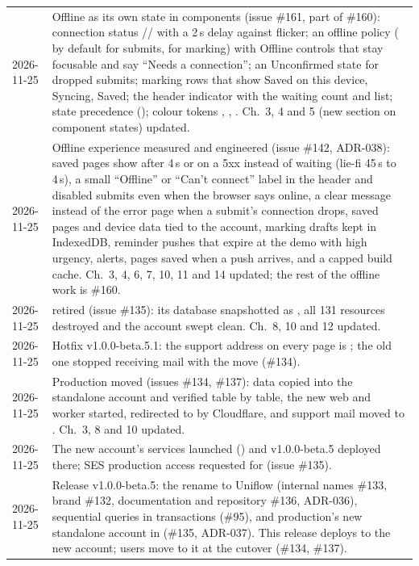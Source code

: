 \begin{xltabular}{\linewidth}{@{}l L@{}}
  2026-11-25 & Offline as its own state in components (issue \#161, part of \#160): connection status // with a 2\,s delay against flicker; an offline policy ( by default for submits,  for marking) with  Offline controls that stay focusable and say ``Needs a connection''; an Unconfirmed state for dropped submits; marking rows that show Saved on this device, Syncing, Saved; the header indicator with the waiting count and list; state precedence (); colour tokens , , . Ch.~3, 4 and 5 (new section on component states) updated.\\
  2026-11-25 & Offline experience measured and engineered (issue \#142, ADR-038): saved pages show after 4\,s or on a 5xx instead of waiting (lie-fi 45\,s to 4\,s), a small ``Offline'' or ``Can't connect'' label in the header and disabled submits even when the browser says online, a clear message instead of the error page when a submit's connection drops, saved pages and device data tied to the account, marking drafts kept in IndexedDB, reminder pushes that expire at the demo with high urgency,  alerts, pages saved when a push arrives, and a capped build cache. Ch.~3, 4, 6, 7, 10, 11 and 14 updated; the rest of the offline work is \#160.\\
  2026-11-25 &  retired (issue \#135): its database snapshotted as , all 131 resources destroyed and the account swept clean. Ch.~8, 10 and 12 updated.\\
  2026-11-25 & Hotfix v1.0.0-beta.5.1: the support address on every page is ; the old one stopped receiving mail with the move (\#134).\\
  2026-11-25 & Production moved (issues \#134, \#137): data copied into the standalone account and verified table by table, the new web and worker started,  redirected to  by Cloudflare, and support mail moved to . Ch.~3, 8 and 10 updated.\\
  2026-11-25 & The new account's services launched () and v1.0.0-beta.5 deployed there; SES production access requested for  (issue \#135).\\
  2026-11-25 & Release v1.0.0-beta.5: the rename to Uniflow (internal names \#133, brand \#132, documentation and repository \#136, ADR-036), sequential queries in transactions (\#95), and production's new standalone account in  (\#135, ADR-037). This release deploys to the new account; users move to it at the cutover (\#134, \#137).\\

\end{xltabular}
